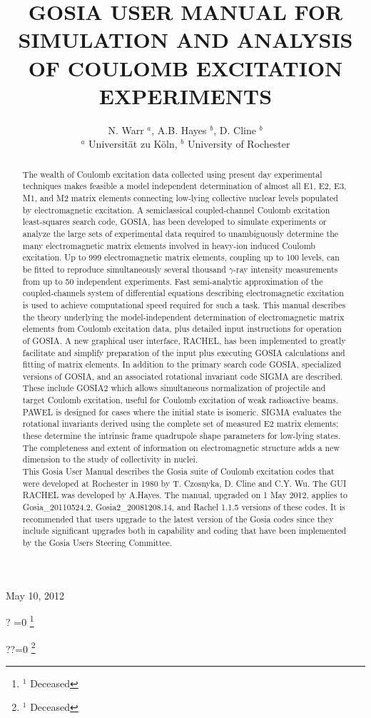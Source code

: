 \documentclass[10pt]{article}
\title{GOSIA USER MANUAL FOR SIMULATION AND ANALYSIS OF COULOMB EXCITATION EXPERIMENTS }
\author{N. Warr ${ }^{a}$, A.B. Hayes ${ }^{b}$, D. Cline ${ }^{b}$\\
${ }^{a}$ Universität zu Köln, ${ }^{b}$ University of Rochester}
\date{}
\let\svthefootnote\thefootnote
\newcommand\blfootnotetext[1]{%
  \let\thefootnote\relax\footnote{#1}%
  \addtocounter{footnote}{-1}%
  \let\thefootnote\svthefootnote%
}
\let\svfootnotetext\footnotetext
\renewcommand\footnotetext[2][?]{%
  \if\relax#1\relax%
    \ifnum\value{footnote}=0\blfootnotetext{#2}\else\svfootnotetext{#2}\fi%
  \else%
    \if?#1\ifnum\value{footnote}=0\blfootnotetext{#2}\else\svfootnotetext{#2}\fi%
    \else\svfootnotetext[#1]{#2}\fi%
  \fi
}
\begin{document}
\maketitle
May 10, 2012

\begin{abstract}
The wealth of Coulomb excitation data collected using present day experimental techniques makes feasible a model independent determination of almost all E1, E2, E3, M1, and M2 matrix elements connecting low-lying collective nuclear levels populated by electromagnetic excitation. A semiclassical coupled-channel Coulomb excitation least-squares search code, GOSIA, has been developed to simulate experiments or analyze the large sets of experimental data required to unambiguously determine the many electromagnetic matrix elements involved in heavy-ion induced Coulomb excitation. Up to 999 electromagnetic matrix elements, coupling up to 100 levels, can be fitted to reproduce simultaneously several thousand $\gamma$-ray intensity measurements from up to 50 independent experiments. Fast semi-analytic approximation of the coupled-channels system of differential equations describing electromagnetic excitation is used to achieve computational speed required for such a task. This manual describes the theory underlying the model-independent determination of electromagnetic matrix elements from Coulomb excitation data, plus detailed input instructions for operation of GOSIA. A new graphical user interface, RACHEL, has been implemented to greatly facilitate and simplify preparation of the input plus executing GOSIA calculations and fitting of matrix elements. In addition to the primary search code GOSIA, specialized versions of GOSIA, and an associated rotational invariant code SIGMA are described. These include GOSIA2 which allows simultaneous normalization of projectile and target Coulomb excitation, useful for Coulomb excitation of weak radioactive beams. PAWEL is designed for cases where the initial state is isomeric. SIGMA evaluates the rotational invariants derived using the complete set of measured E2 matrix elements; these determine the intrinsic frame quadrupole shape parameters for low-lying states. The completeness and extent of information on electromagnetic structure adds a new dimension to the study of collectivity in nuclei.\\
This Gosia User Manual describes the Gosia suite of Coulomb excitation codes that were developed at Rochester in 1980 by T. Czosnyka, D. Cline and C.Y. Wu. The GUI RACHEL was developed by A.Hayes. The manual, upgraded on 1 May 2012, applies to Gosia\_20110524.2, Gosia2\_20081208.14, and Rachel 1.1.5 versions of these codes. It is recommended that users upgrade to the latest version of the Gosia codes since they include significant upgrades both in capability and coding that have been implemented by the Gosia Users Steering Committee.
\end{abstract}
\end{document}
